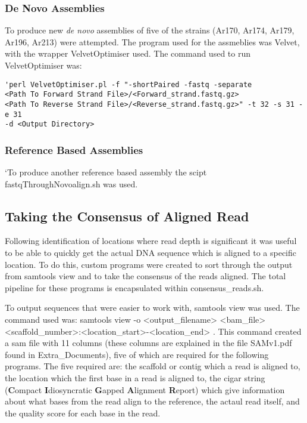 \documentclass[../main.tex]{subfiles}
\begin{document}
	\subsubsection{De Novo Assemblies}
	To produce new \textit{de novo} assemblies of five of the strains (Ar170, Ar174, Ar179, Ar196, Ar213) were attempted. The program used for the assmeblies was Velvet, with the wrapper VelvetOptimiser used. The command used to run VelvetOptimiser was: 
\begin{verbatim}
'perl VelvetOptimiser.pl -f "-shortPaired -fastq -separate 
<Path To Forward Strand File>/<Forward_strand.fastq.gz> 
<Path To Reverse Strand File>/<Reverse_strand.fastq.gz>" -t 32 -s 31 -e 31 
-d <Output Directory>
\end{verbatim}

	\subsubsection{Reference Based Assemblies}
	`To produce another reference based assembly the scipt fastqThroughNovoalign.sh was used.

\subsection{Taking the Consensus of Aligned Read}
	Following identification of locations where read depth is significant it was useful to be able to quickly get the actual DNA sequence which is aligned to a specific location. To do this, custom programs were created to sort through the output from samtools view and to take the consensus of the reads aligned. The total pipeline for these programs is encapsulated within consensus\_reads.sh.
	
	To output sequences that were easier to work with, samtools view was used. The command used was: samtools view -o <output_filename> <bam_file> <scaffold_number>:<location_start>-<location_end> . This command created a sam file with 11 columns (these columns are explained in the file SAMv1.pdf found in Extra_Documents), five of which are required for the following programs. The five required are: the scaffold or contig which a read is aligned to, the location which the first base in a read is aligned to, the cigar string (\textbf{C}ompact \textbf{I}diosyncratic \textbf{G}apped \textbf{A}lignment \textbf{R}eport) which give information about what bases from the read align to the reference, the actaul read itself, and the quality score for each base in the read. 
\end{document}
